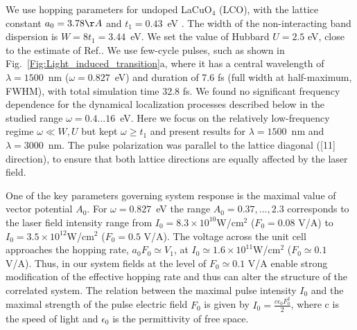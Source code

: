 We use hopping parameters for undoped 
LaCuO$_4$ (LCO), with the lattice constant $a_{0}=3.78\AA$ and
$t_1=0.43$~eV \cite{Markiewicz}. 
The width of the
non-interacting band dispersion is $W=8t_1=3.44$~eV.  
We set the value of Hubbard $U=2.5$ eV,  
close to the estimate of Ref.\cite{Delannoy}.
We use few-cycle pulses, such as
shown in Fig.~\ref{Fig:Light_induced_transition}a, where it has a central wavelength of $\lambda=1500$~nm ($\omega=0.827$~eV) and duration of 7.6 fs (full width at half-maximum, FWHM), with
total simulation time 32.8 fs. We found no significant frequency dependence for the dynamical localization processes 
described below in the studied range 
$\omega=0.4...16$~eV. Here we focus on the 
relatively low-frequency regime $\omega \ll W,U$
but kept $\omega\geq t_1$ and present results for
$\lambda=1500$~nm and $\lambda=3000$~nm.
The pulse polarization was parallel to the lattice diagonal ([11] direction), to ensure that both lattice directions are
equally affected by the laser field. 


One of the key parameters governing system response is the maximal value of vector potential
${A}_{0}$. For  
$\omega=0.827$~eV the range 
${A}_{0} = 0.37,..., 2.3$ corresponds to the laser field intensity range from
$I_0=8.3 \times 10^{10}$W/cm$^2$ 
($F_0=0.08$ V/A) 
to $I_0=3.5 \times 10^{12}$W/cm$^2$ 
($F_0=0.5$ V/A). The voltage across the 
unit cell approaches the hopping rate, $a_0F_0 \simeq V_1$, at  
$I_0\simeq 1.6 \times 10^{11}$W/cm$^2$
($F_0\simeq 0.1$ V/A). Thus, in our system
fields at the level of $F_0\simeq 0.1$ V/A enable 
strong modification of the effective hopping rate and
thus can alter the structure of the correlated system.  
The relation between the maximal pulse intensity $I_0$ and the maximal strength of the pulse electric field $F_0$
is given by $I_0 = \frac{c \epsilon_0 F_0^2}{2}$, where c is the speed of light and $\epsilon_0$ is the permittivity of free space.

